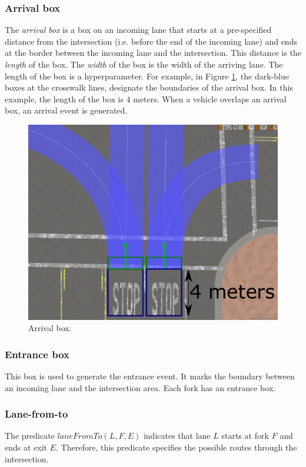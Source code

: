 \subsubsection{Arrival box}
The \emph{arrival box} is 
a box on an incoming lane that starts at
a pre-specified distance from the intersection (i.e. before the end of the incoming lane)
and ends at the border between the incoming lane and the intersection.
This distance is the \emph{length} of the box.
The \emph{width} of the box is the width of the arriving lane.
The length of the box is a hyperparameter.
For example,
in Figure \ref{fig:arrival-line},
the dark-blue boxes at the crosswalk lines,
designate the boundaries of the arrival box.
In this example,
the length of the box is 4 meters.
When a vehicle overlaps an arrival box,
an arrival event is generated.

\begin{figure}
\centering
\includegraphics[width=.5\linewidth]{figures/chapter3/arrival-line.pdf}
\caption{Arrival box.}
\label{fig:arrival-line}
\vspace{-0.5cm}
\end{figure}

\subsubsection{Entrance box}
This box is used to generate the entrance event.
It marks the boundary between an incoming lane and the intersection area.
Each fork has an entrance box.
\subsubsection{Lane-from-to}
The predicate $laneFromTo(L, F, E)$
indicates that lane $L$ starts at fork $F$ and ends at exit $E$.
Therefore,
this predicate specifies the possible routes through the intersection.
